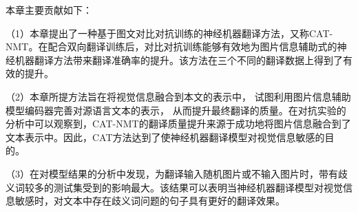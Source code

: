 本章主要贡献如下：

（1）本章提出了一种基于图文对比对抗训练的神经机器翻译方法，又称CAT-NMT。在配合双向翻译训练后，对比对抗训练能够有效地为图片信息辅助式的神经机器翻译方法带来翻译准确率的提升。该方法在三个不同的翻译数据上得到了有效的提升。

（2）本章所提方法旨在将视觉信息融合到本文的表示中，
试图利用图片信息辅助模型编码器完善对源语言文本的表示，
从而提升最终翻译的质量。在对抗实验的分析中可以观察到，CAT-NMT的翻译质量提升来源于成功地将图片信息融合到了文本表示中。因此，CAT方法达到了使神经机器翻译模型对视觉信息敏感的目的。

（3）在对模型结果的分析中发现，为翻译输入随机图片或不输入图片时，带有歧义词较多的测试集受到的影响最大。该结果可以表明当神经机器翻译模型对视觉信息敏感时，对文本中存在歧义词问题的句子具有更好的翻译效果。